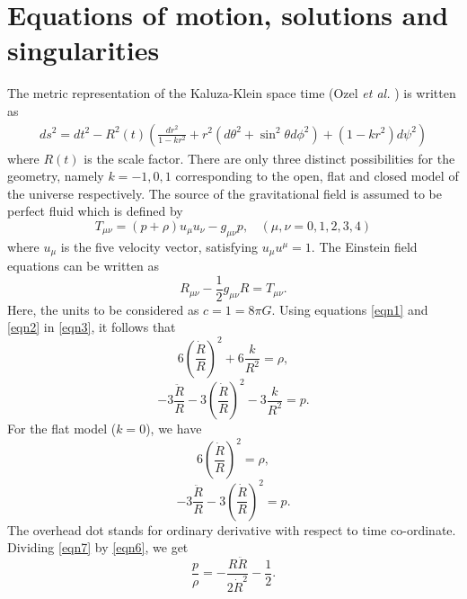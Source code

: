 \documentclass[11pt]{article}
\theoremstyle{theorem}
\theoremstyle{defi}
\begin{document}
\section{Equations of motion, solutions and singularities}
The metric representation of the Kaluza-Klein space time (Ozel \emph{et al.} \cite{31}) is written as
\begin{eqnarray}
\label{eqn1}
ds^2=dt^2-R^2(t)\left(\frac{dr^2}{1-kr^2}+r^2\left(d\theta^2+\sin^2\theta d\phi^2\right)+
(1-kr^2)d\psi^2\right)
\end{eqnarray}
where $R(t)$ is the scale factor. There are only three distinct possibilities for the geometry, namely $k=-1, 0, 1$ corresponding to the open, flat and closed model of the universe respectively. The source of the gravitational field is assumed to be perfect fluid which is defined by
\begin{equation}
\label{eqn2}
T_{\mu\nu}=(p+\rho)u_{\mu}u_{\nu}-g_{\mu\nu}p,~~~~  (\mu, \nu=0, 1, 2, 3, 4)
\end{equation}
where $u_{\mu}$ is the five velocity vector, satisfying $u_{\mu}u^{\mu}=1$.
The Einstein field equations can be written as
\begin{equation}
\label{eqn3}
R_{\mu\nu}-\frac{1}{2}g_{\mu\nu}R=T_{\mu\nu}.
\end{equation}
Here, the units to be considered as $c=1=8\pi G$.
Using equations \eqref{eqn1} and \eqref{eqn2} in \eqref{eqn3}, it follows that
\begin{equation}
\label{eqn4}
6\left(\frac{\dot{R}}{R}\right)^2+6\frac{k}{R^2}=\rho,
\end{equation}
\begin{equation}
\label{eqn5}
-3\frac{\ddot{R}}{R}-3\left(\frac{\dot{R}}{R}\right)^2-3\frac{k}{R^2}=p.
\end{equation}
For the flat model ($k=0$), we have
\begin{equation}
\label{eqn6}
6\left(\frac{\dot{R}}{R}\right)^2=\rho,
\end{equation}
\begin{equation}
\label{eqn7}
-3\frac{\ddot{R}}{R}-3\left(\frac{\dot{R}}{R}\right)^2=p.
\end{equation}
The overhead dot stands for ordinary derivative with respect to time co-ordinate.
Dividing \eqref{eqn7} by \eqref{eqn6}, we get
\begin{equation}
\label{eqn8}
\frac{p}{\rho}=-\frac{R\ddot{R}}{2{\dot{R}^2}}-\frac{1}{2}.
\end{equation}
\end{document}
